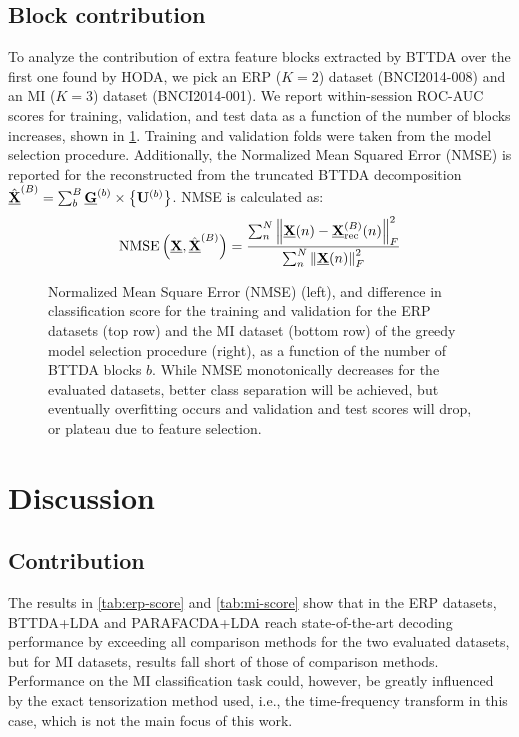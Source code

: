 \subsection{Block contribution}
To analyze the contribution of extra feature blocks extracted by BTTDA over
the first one found by HODA, we pick an ERP ($K=2$) dataset
(BNCI2014-008) and an MI ($K=3$) dataset (BNCI2014-001).
We report within-session ROC-AUC scores for training, validation, and test data as a function
of the number of blocks increases, shown in \cref{fig:blocks}.
Training and validation folds were taken from the model selection procedure.
Additionally, the Normalized Mean Squared Error (NMSE) is reported for the
reconstructed from the truncated BTTDA decomposition
$\textstyle{\hat{\underline{\mathbf{X}}}^{(B)}=\sum_b^B\underline{\mathbf{G}}^{(b)}\times\left\{\mathbf{U}^{(b)}\right\}}$.
NMSE is calculated as:
\begin{equation}
  \operatorname{NMSE}\left(\underline{\mathbf{X}}, \hat{\underline{\mathbf{X}}}^{(B)}\right) =
	\frac{\sum_n^N\left\lVert\underline{\mathbf{X}}(n)-\underline{\mathbf{X}}_\text{rec}^{(B)}(n)\right\rVert_F^2}
	{\sum_n^N\left\lVert\underline{\mathbf{X}}(n)\right\rVert_F^2}
\end{equation}
\begin{figure}[t]
  \centering
  \makebox[\linewidth][c]{
	  
  }
  \caption[Analysis of NMSE and classification score per block.]{%
    Normalized Mean Square Error (NMSE) (left), and difference in
    classification score for the training and validation for the ERP datasets
    (top row) and the MI dataset (bottom row)	of the greedy model selection
    procedure (right), as a function of the number of BTTDA blocks $b$.
		While NMSE monotonically decreases for the evaluated datasets, better class
		separation will be achieved, but eventually overfitting occurs and validation
		and test scores will drop, or plateau due to feature selection.
	}
	\label{fig:blocks}
\end{figure}

\section{Discussion}
\subsection{Contribution}
The results in \cref{tab:erp-score} and \autoref{tab:mi-score} show that
in the ERP datasets, BTTDA+LDA and PARAFACDA+LDA reach state-of-the-art decoding performance by
exceeding all comparison methods for the two evaluated datasets, but
for MI datasets, results fall short of those of comparison methods.
Performance on the MI classification task could, however, be greatly influenced
by the exact tensorization method used, i.e., the time-frequency transform in
this case, which is not the main focus of this work.

